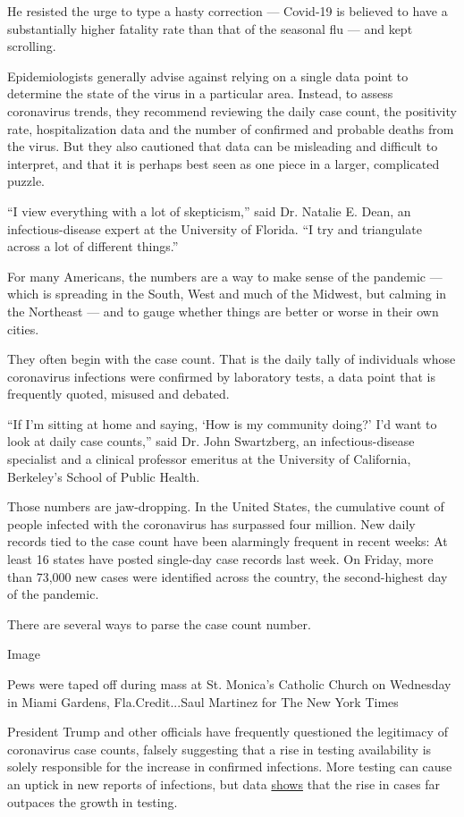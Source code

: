 He resisted the urge to type a hasty correction --- Covid-19 is believed
to have a substantially higher fatality rate than that of the seasonal
flu --- and kept scrolling.

Epidemiologists generally advise against relying on a single data point
to determine the state of the virus in a particular area. Instead, to
assess coronavirus trends, they recommend reviewing the daily case
count, the positivity rate, hospitalization data and the number of
confirmed and probable deaths from the virus. But they also cautioned
that data can be misleading and difficult to interpret, and that it is
perhaps best seen as one piece in a larger, complicated puzzle.

``I view everything with a lot of skepticism,'' said Dr. Natalie E.
Dean, an infectious-disease expert at the University of Florida. ``I try
and triangulate across a lot of different things.''

For many Americans, the numbers are a way to make sense of the pandemic
--- which is spreading in the South, West and much of the Midwest, but
calming in the Northeast --- and to gauge whether things are better or
worse in their own cities.

They often begin with the case count. That is the daily tally of
individuals whose coronavirus infections were confirmed by laboratory
tests, a data point that is frequently quoted, misused and debated.

``If I'm sitting at home and saying, `How is my community doing?' I'd
want to look at daily case counts,'' said Dr. John Swartzberg, an
infectious-disease specialist and a clinical professor emeritus at the
University of California, Berkeley's School of Public Health.

Those numbers are jaw-dropping. In the United States, the cumulative
count of people infected with the coronavirus has surpassed four
million. New daily records tied to the case count have been alarmingly
frequent in recent weeks: At least 16 states have posted single-day case
records last week. On Friday, more than 73,000 new cases were identified
across the country, the second-highest day of the pandemic.

There are several ways to parse the case count number.

Image

Pews were taped off during mass at St. Monica's Catholic Church on
Wednesday in Miami Gardens, Fla.Credit...Saul Martinez for The New York
Times

President Trump and other officials have frequently questioned the
legitimacy of coronavirus case counts, falsely suggesting that a rise in
testing availability is solely responsible for the increase in confirmed
infections. More testing can cause an uptick in new reports of
infections, but data
\href{https://www.nytimes.com/interactive/2020/07/22/us/covid-testing-rising-cases.html?action=click\&module=RelatedLinks\&pgtype=Article}{shows}
that the rise in cases far outpaces the growth in testing.


